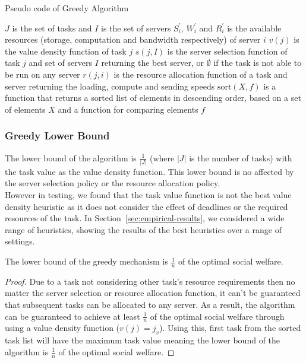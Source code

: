 \begin{algorithm}
    \caption{Pseudo code of Greedy Algorithm}
    \label{alg:greedy-mechanism}
    \begin{algorithmic}
        \REQUIRE $J$ is the set of tasks and $I$ is the set of servers
        \REQUIRE $S^{'}_i$, $W^{'}_i$ and $R^{'}_i$ is the available resources
            (storage, computation and bandwidth respectively) of server $i$
        \REQUIRE $v(j)$ is the value density function of task $j$
        \REQUIRE $s(j, I)$ is the server selection function of task $j$ and set of servers $I$ returning the best
            server, or $\emptyset$ if the task is not able to be run on any server
        \REQUIRE $r(j, i)$ is the resource allocation function of a task and server returning the
            loading, compute and sending speeds
        \REQUIRE $\text{sort}(X, f)$ is a function that returns a sorted list of elements in descending order, based
            on a set of elements $X$ and a function for comparing elements $f$

            \ENDIF
        \ENDFOR
    \end{algorithmic}
\end{algorithm}

\subsubsection{Greedy Lower Bound}
\label{subsubsec:greedy-lower-bound}
The lower bound of the algorithm is $\frac{1}{\left|J\right|}$ (where $\left|J\right|$ is the number of tasks) with
the task value as the value density function. This lower bound is no affected by the server selection policy or the
resource allocation policy. \\
However in testing, we found that the task value function is not the best value density heuristic as it does not
consider the effect of deadlines or the required resources of the task. In Section~\ref{sec:empirical-results}, we
considered a wide range of heuristics, showing the results of the best heuristics over a range of settings.

\begin{theorem}
    The lower bound of the greedy mechanism is $\frac{1}{n}$ of the optimal social welfare.
\end{theorem}
\begin{proof}
    Due to a task not considering other task's resource requirements then no matter the server selection or resource
    allocation function, it can't be guaranteed that subsequent tasks can be allocated to any server. As a result,
    the algorithm can be guaranteed to achieve at least $\frac{1}{n}$ of the optimal social welfare through using a
    value density function ($v(j) = j_v$). Using this, first task from the sorted task list will have the maximum task
    value meaning the lower bound of the algorithm is $\frac{1}{n}$ of the optimal social welfare.
\end{proof}

